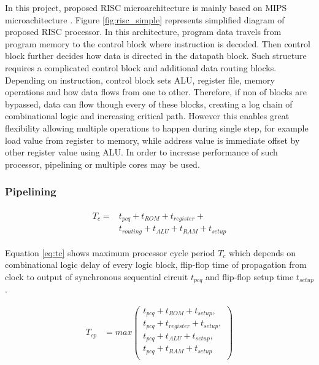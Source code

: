 In this project, proposed RISC microarchitecture is mainly based on MIPS microachitecture \autocite{harris_harris_2013}. Figure \ref{fig:risc_simple} represents simplified diagram of proposed RISC processor. In this architecture, program data travels from program memory to the control block where instruction is decoded. Then control block further decides how data is directed in the datapath block. Such structure requires a complicated control block and additional data routing blocks. Depending on instruction, control block sets ALU, register file, memory operations and how data flows from one to other. Therefore, if non of blocks are bypassed, data can flow though every of these blocks, creating a log chain of combinational logic and increasing critical path. However this enables great flexibility allowing multiple operations to happen during single step, for example load value from register to memory, while address value is immediate offset by other register value using ALU. In order to increase performance of such processor, pipelining or multiple cores may be used.

\subsubsection{Pipelining}
\begin{multline}\label{eq:tc}
	\begin{split}
	T_c =& t_{pcq} + t_{ROM} + t_{register} + \\
	 	 & t_{routing} + t_{ALU} + t_{RAM} + t_{setup}
	\end{split}
\end{multline}

Equation \ref{eq:tc} shows maximum processor cycle period $T_c$ which depends on combinational logic delay of every logic block, flip-flop time of propagation from clock to output of synchronous sequential circuit $t_{pcq}$ and flip-flop setup time $t_{setup}$.

\begin{align}\label{eq:tcp}
	T_{cp} &= max \left( \begin{matrix}
	t_{pcq} + t_{ROM} + t_{setup},\\
	t_{pcq} + t_{register} + t_{setup},\\
	t_{pcq} + t_{ALU} + t_{setup},\\
	t_{pcq} + t_{RAM} + t_{setup}\\
	\end{matrix}\right)
\end{align}


